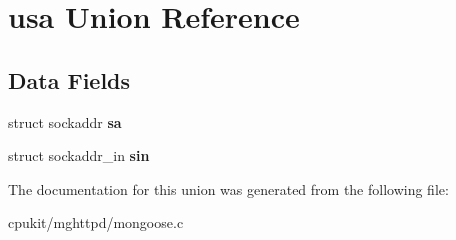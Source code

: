 \hypertarget{unionusa}{}\section{usa Union Reference}
\label{unionusa}
\subsection*{Data Fields}
\begin{DoxyCompactItemize}
\item 
\mbox{\label{unionusa_a3bc7f8512f2fb0e7ef3e8c69dd794df1}} 
struct sockaddr {\bfseries sa}
\item 
\mbox{\label{unionusa_a680bc429e90923ecbbf9c7d38ba4bf26}} 
struct sockaddr\+\_\+in {\bfseries sin}
\end{DoxyCompactItemize}


The documentation for this union was generated from the following file\+:\begin{DoxyCompactItemize}
\item 
cpukit/mghttpd/mongoose.\+c\end{DoxyCompactItemize}
